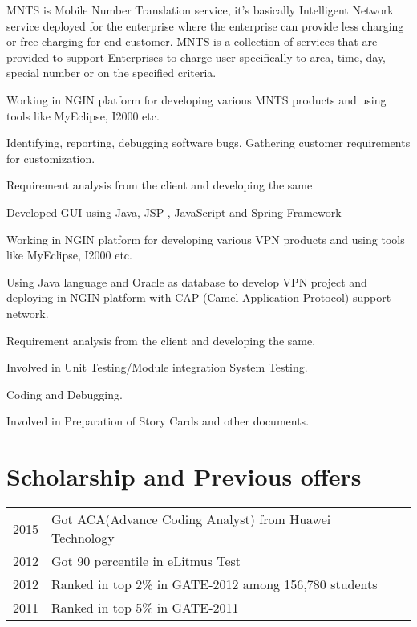 \documentclass[]{prashant-resume-openfont}
\begin{document}
\begin{minipage}[t]{0.66\textwidth}
\begin{tightemize}\item MNTS is Mobile Number Translation service, it’s basically Intelligent Network service deployed for the enterprise where the enterprise can provide less charging or free charging for end customer. MNTS is a collection of services that are provided to support Enterprises to charge user specifically to area, time, day, special number or on the specified criteria.\item Working in NGIN platform for developing various MNTS products and using tools like MyEclipse, I2000 etc.\item Identifying, reporting, debugging software bugs. Gathering customer requirements for customization. \item Requirement analysis from the client and developing the same 
\end{tightemize} 
\sectionsep


\begin{tightemize}\item Developed GUI using Java, JSP , JavaScript and Spring Framework \item Working in NGIN platform for developing various VPN products and using tools like MyEclipse, I2000 etc.\item Using Java language and Oracle as database to develop VPN project and deploying in NGIN platform with CAP (Camel Application Protocol) support network. \item Requirement analysis from the client and developing the same.\item Involved in Unit Testing/Module integration System Testing.\item Coding and Debugging.\item Involved in Preparation of Story Cards and other documents.
\end{tightemize} 
\sectionsep



\section{Scholarship and Previous offers} 
\begin{tabular}{rll}
2015	     & Got ACA(Advance Coding Analyst) from Huawei Technology\\
2012	     & Got 90 percentile in eLitmus Test\\
2012	     & Ranked in top 2\% in GATE-2012 among 156,780 students\\
2011	     & Ranked in top 5\% in GATE-2011\\
\end{tabular}
\sectionsep


\sectionsep

\end{minipage} 
\end{document}
